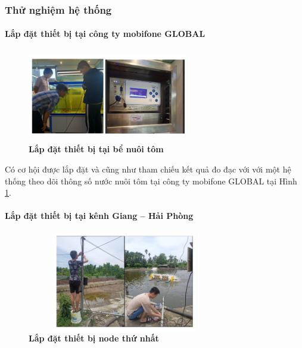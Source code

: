 \documentclass{article} %
\begin{document}
	
	
	\subsubsection{Thử nghiệm hệ thống}
	
	\paragraph{Lắp đặt thiết bị tại công ty mobifone GLOBAL}\mbox{}
	
	\begin{figure}[!ht]
		\centering
		\includegraphics[width=7cm,height=4cm]{Images/ldtamobi.png}
		\caption[ Lắp đặt thiết bị tại bể nuôi tôm ]{\bfseries \fontsize{12pt}{0pt}\selectfont  Lắp đặt thiết bị tại bể nuôi tôm}
		\label{ldtamobi}
	\end{figure}
	
	Có cơ hội được lắp đặt và cũng như tham chiếu kết quả đo đạc với với một hệ thống theo dõi thông số nước nuôi tôm tại công ty mobifone GLOBAL tại Hình \ref{ldtamobi}.
	\newpage
	\paragraph{Lắp đặt thiết bị tại kênh Giang – Hải Phòng}\mbox{}
	
	\begin{figure}[!ht]
		\centering
		\includegraphics[width=8.5cm,height=4.3cm]{Images/ldnode1.png}
		\caption[ Lắp đặt thiết bị node thứ nhất ]{\bfseries \fontsize{12pt}{0pt}\selectfont Lắp đặt thiết bị node thứ nhất}
		\label{ldnode1}
	\end{figure}
	
\end{document}
